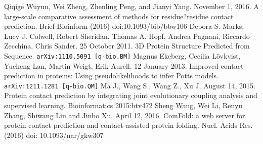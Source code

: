 \documentclass{article}
\begin{document}
\begin{thebibliography}{9}
{\setlength\itemsep{0.0em}
	Qiqige Wuyun, Wei Zheng, Zhenling Peng, and Jianyi Yang. November 1, 2016. A large-scale comparative assessment of methods for residue?residue contact prediction. Brief Bioinform (2016) doi:10.1093/bib/bbw106
	Debora S. Marks, Lucy J. Colwell, Robert Sheridan, Thomas A. Hopf, Andrea Pagnani, Riccardo Zecchina, Chris Sander. 25 October 2011. 3D Protein Structure Predicted from Sequence. {\tt arXiv:1110.5091 [q-bio.BM]}
	Magnus Ekeberg, Cecilia L{\"o}vkvist, Yueheng Lan, Martin Weigt, Erik Aurell. 12 January 2013. Improved contact prediction in proteins: Using pseudolikelihoods to infer Potts models. {\tt arXiv:1211.1281 [q-bio.QM]}
	 Ma J., Wang S., Wang Z., Xu J. August 14, 2015. Protein contact prediction by integrating joint evolutionary coupling analysis and supervised learning. Bioinformatics 2015:btv472
	Sheng Wang,  Wei Li, Renyu Zhang, Shiwang Liu and Jinbo Xu. April 12, 2016. CoinFold: a web server for protein contact prediction and contact-assisted protein folding. Nucl. Acids Res. (2016) doi: 10.1093/nar/gkw307
}
\end{thebibliography}
\end{document}

